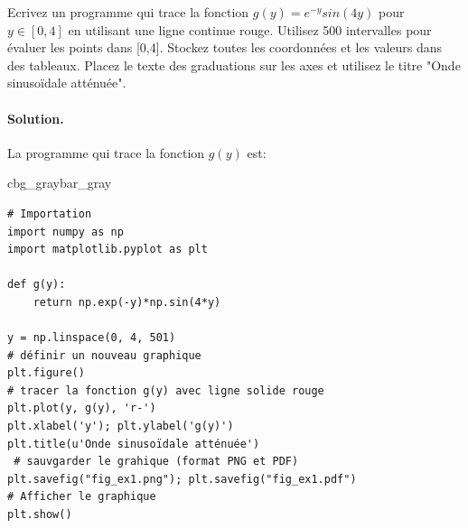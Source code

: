 \documentclass[%
oneside,                 %
final,                   %
10pt,french]{article}
\newenvironment{_pro_tight}[2]{
   \def\FrameCommand{\color{#2}\vrule width 1mm\normalcolor\colorbox{#1}}
   \FrameRule0.6pt\MakeFramed {\advance\hsize-2mm\FrameRestore}\vskip3mm}
   {\vskip0mm\endMakeFramed}
\newenvironment{pro}[2]{
\bgroup\rmfamily
\fboxsep=0mm\relax
\begin{_pro_tight}{#1}{#2}
\list{}{\parsep=-2mm\parskip=0mm\topsep=0pt\leftmargin=2mm
\rightmargin=2\leftmargin\leftmargin=4pt\relax}
\item\relax}
{\endlist\end{_pro_tight}\egroup}
\newenvironment{doconceexercise}{}{}
\newcounter{doconceexercisecounter}
\begin{document}
\begin{doconceexercise}



Ecrivez un programme qui trace la fonction $g(y) = e^{-y} sin(4y)$ pour $y \in [0, 4]$ en utilisant une ligne continue rouge. Utilisez 500 intervalles pour évaluer les points dans [0,4]. Stockez toutes les coordonnées et les valeurs dans des tableaux. Placez le texte des graduations sur les axes et utilisez le titre "Onde sinusoïdale atténuée".


\paragraph{Solution.}
La programme qui trace la fonction $g(y)$ est:
\begin{pro}{cbg_gray}{bar_gray}\begin{verbatim}
# Importation
import numpy as np
import matplotlib.pyplot as plt

def g(y):
    return np.exp(-y)*np.sin(4*y)

y = np.linspace(0, 4, 501)
# définir un nouveau graphique
plt.figure()
# tracer la fonction g(y) avec ligne solide rouge
plt.plot(y, g(y), 'r-')
plt.xlabel('y'); plt.ylabel('g(y)')
plt.title(u'Onde sinusoïdale atténuée')
 # sauvgarder le grahique (format PNG et PDF)
plt.savefig("fig_ex1.png"); plt.savefig("fig_ex1.pdf")
# Afficher le graphique
plt.show()
\end{verbatim}
\end{pro}
\noindent


\end{doconceexercise}
\end{document}

